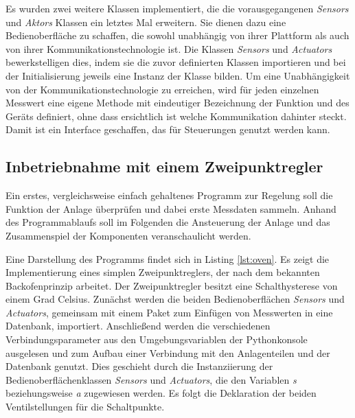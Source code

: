 

Es wurden zwei weitere Klassen implementiert, die die vorausgegangenen \textit{Sensors} und \textit{Aktors} Klassen ein letztes Mal erweitern. Sie dienen dazu eine Bedienoberfläche zu schaffen, die sowohl unabhängig von ihrer Plattform als auch von ihrer Kommunikationstechnologie ist. Die Klassen \textit{Sensors} und \textit{Actuators} bewerkstelligen dies, indem sie die zuvor definierten Klassen importieren und bei der Initialisierung jeweils eine Instanz der Klasse bilden. Um eine Unabhängigkeit von der Kommunikationstechnologie zu erreichen, wird für jeden einzelnen Messwert eine eigene Methode mit eindeutiger Bezeichnung der Funktion und des Geräts definiert, ohne dass ersichtlich ist welche Kommunikation dahinter steckt. Damit ist ein Interface geschaffen, das für Steuerungen genutzt werden kann.



\subsection{Inbetriebnahme mit einem Zweipunktregler}

Ein erstes, vergleichsweise einfach gehaltenes Programm zur Regelung soll die Funktion der Anlage überprüfen und dabei erste Messdaten sammeln. Anhand des Programmablaufs soll im Folgenden die Ansteuerung der Anlage und das Zusammenspiel der Komponenten veranschaulicht werden.

Eine Darstellung des Programms findet sich in Listing \ref{lst:oven}. Es zeigt die Implementierung eines simplen Zweipunktreglers, der nach dem bekannten Backofenprinzip arbeitet. Der Zweipunktregler besitzt eine Schalthysterese von einem Grad Celsius. Zunächst werden die beiden Bedienoberflächen \textit{Sensors} und \textit{Actuators}, gemeinsam mit einem Paket zum Einfügen von Messwerten in eine Datenbank, importiert. Anschließend werden die verschiedenen Verbindungsparameter aus den Umgebungsvariablen der Pythonkonsole ausgelesen und zum Aufbau einer Verbindung mit den Anlagenteilen und der Datenbank genutzt. Dies geschieht durch die Instanziierung der Bedienoberflächenklassen \textit{Sensors} und \textit{Actuators}, die den Variablen \textit{s} beziehungsweise \textit{a} zugewiesen werden. Es folgt die Deklaration der beiden Ventilstellungen für die Schaltpunkte. 

